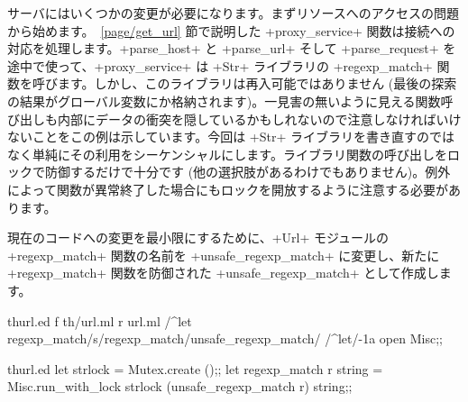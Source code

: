 \http サーバにはいくつかの変更が必要になります。まずリソースへのアクセスの問題から始めます。~\ref{page/get_url} 節で説明した \ml+proxy_service+ 関数は接続への対応を処理します。\ml+parse_host+ と \ml+parse_url+ そして \ml+parse_request+ を途中で使って、\ml+proxy_service+ は \ml+Str+ ライブラリの \ml+regexp_match+ 関数を呼びます。しかし、このライブラリは再入可能ではありません (最後の探索の結果がグローバル変数にか格納されます)。一見害の無いように見える関数呼び出しも内部にデータの衝突を隠しているかもしれないので注意しなければいけないことをこの例は示しています。今回は \ml+Str+ ライブラリを書き直すのではなく単純にその利用をシーケンシャルにします。ライブラリ関数の呼び出しをロックで防御するだけで十分です (他の選択肢があるわけでもありません)。例外によって関数が異常終了した場合にもロックを開放するように注意する必要があります。

現在のコードへの変更を最小限にするために、\ml+Url+ モジュールの\ml+regexp_match+ 関数の名前を \ml+unsafe_regexp_match+ に変更し、新たに \ml+regexp_match+ 関数を防御された \ml+unsafe_regexp_match+ として作成します。
%
\begin{codefile}{thurl.ed}
f th/url.ml
r url.ml
/^let regexp_match/s/regexp_match/unsafe_regexp_match/
/^let/-1a
open Misc;;
\end{codefile}
%
\begin{listingcodefile}{thurl.ed}
let strlock = Mutex.create ();;
let regexp_match r string =
  Misc.run_with_lock strlock (unsafe_regexp_match r) string;;
\end{listingcodefile}

